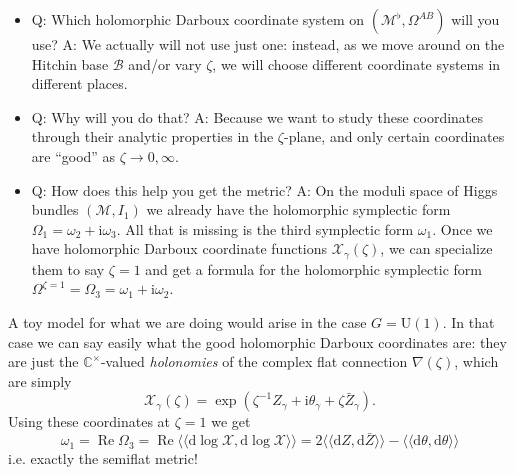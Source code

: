 \documentclass[12pt,letterpaper,reqno]{article}
\numberwithin{equation}{section}
\newcommand{\cB}{\ensuremath{\mathcal B}}
\newcommand{\cM}{\ensuremath{\mathcal M}}
\newcommand{\cX}{\ensuremath{\mathcal X}}
\newcommand{\C}{\ensuremath{\mathbb C}}
\newcommand{\I}{{\mathrm i}}
\newcommand{\de}{\mathrm{d}}
\newcommand{\DIP}[1]{\langle\!\langle#1\rangle\!\rangle}
\newcommand{\ti}[1]{\textit{#1}}
\DeclareMathOperator{\re}{Re}
\newcommand{\U}{\mathrm{U}}
\newcommand{\insfig}[2]{

\medskip
\noindent
\begin{minipage}{\linewidth}

\makebox[\linewidth]{\texttt{[image: figures/\#1-crop.pdf]}}

\end{minipage}
\medskip

}
\begin{document}
\begin{itemize}
\item Q: Which holomorphic Darboux coordinate system on
$(\cM^\flat, \Omega^{AB})$ will you use? A: We actually
will not use just one: instead, as we move around on the
Hitchin base $\cB$ and/or vary $\zeta$, 
we will choose different coordinate
systems in different places.

\insfig{higgs-metric-6}{0.8}

\item Q: Why will you do that? A: Because we want to study
these coordinates through their analytic properties in the
$\zeta$-plane, and only certain coordinates are ``good''
as $\zeta \to 0, \infty$.


\item Q: How does this help you get the metric? A: On the
moduli space of Higgs bundles $(\cM, I_1)$ we 
already have the holomorphic
symplectic form $\Omega_1 = \omega_2 + \I \omega_3$. All that
is missing is the third symplectic form $\omega_1$.
Once we have holomorphic Darboux coordinate functions $\cX_\gamma(\zeta)$,
we can specialize them to say $\zeta = 1$ and get a formula
for the holomorphic symplectic form $\Omega^{\zeta = 1} = \Omega_3 = \omega_1 + \I \omega_2$.

\end{itemize}

A toy model for what we are doing would arise in the
case $G = \U(1)$. In that case we can say easily what
the good holomorphic Darboux coordinates are: they are
just the $\C^\times$-valued \ti{holonomies} of the 
complex flat connection $\nabla(\zeta)$, which are simply
\begin{equation}
  \cX_\gamma(\zeta) = \exp \left( \zeta^{-1} Z_\gamma + \I \theta_\gamma + \zeta \bar Z_\gamma \right).
\end{equation}
Using these coordinates at $\zeta = 1$ we get
\begin{equation}
 \omega_1 = \re \Omega_3 = \re \DIP{\de \log \cX, \de \log \cX} = 2 \DIP{\de Z, \de \bar{Z}} - \DIP{\de \theta, \de \theta}
\end{equation}
i.e. exactly the semiflat metric!
\end{document}
